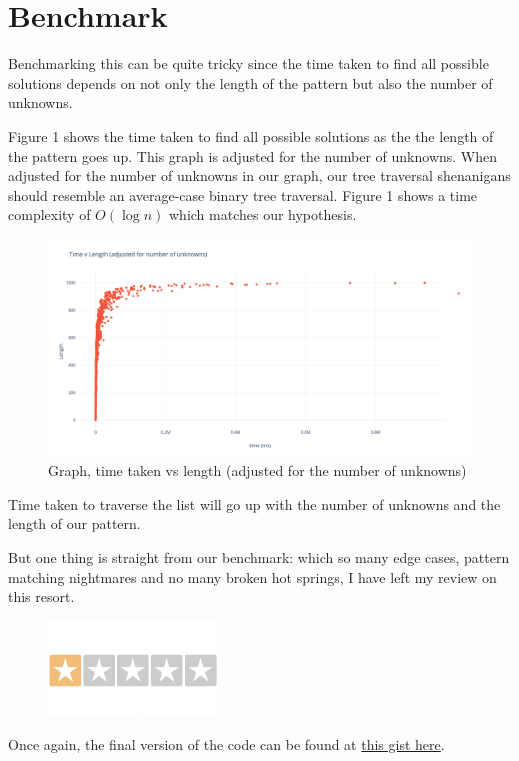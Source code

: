 \section{Benchmark}
Benchmarking this can be quite tricky since the time taken to find all possible solutions depends on not only the length of the pattern but also the number of unknowns. 

Figure 1 shows the time taken to find all possible solutions as the the length of the pattern goes up. This graph is adjusted for the number of unknowns. When adjusted for the number of unknowns in our graph, our tree traversal shenanigans should resemble an average-case binary tree traversal. Figure 1 shows a time complexity of $O(\log n)$ which matches our hypothesis.

\begin{figure}
    \includegraphics[width=\textwidth]{img/time_average}
    \caption{Graph, time taken vs length (adjusted for the number of unknowns)}
\end{figure}

Time taken to traverse the list will go up with the number of unknowns and the length of our pattern. 

But one thing is straight from our benchmark: which so many edge cases, pattern matching nightmares and no many broken hot springs, I have left my review on this resort.
\begin{figure}[bht!]
    \centering
    \includegraphics[width=0.4\textwidth]{img/rating}
\end{figure}

Once again, the final version of the code can be found at \href{https://gist.github.com/ohshitnotgood/3ebf130cf0dab51544ba0ace3cec93ae}{this gist here}.